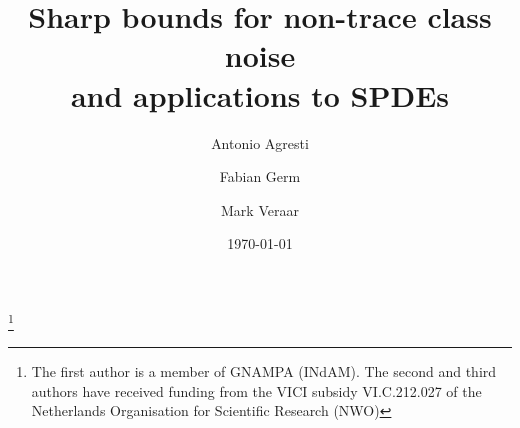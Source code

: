 \documentclass[reqno]{amsart}
\theoremstyle{plain}
\theoremstyle{remark}
\theoremstyle{plain}
\numberwithin{equation}{section}
\newcommand{\1}{\one}
\begin{document}
\author{Antonio Agresti}
\address{Department of Mathematics Guido Castelnuovo, Sapienza University of Rome,
P.le Aldo Moro 5, 00185 Rome, Italy}


\author{Fabian Germ}
\address{Delft Institute of Applied Mathematics\\
Delft University of Technology \\ P.O. Box 5031\\ 2600 GA Delft\\The
Netherlands.} 


\author{Mark Veraar}
\address{Delft Institute of Applied Mathematics\\
Delft University of Technology \\ P.O. Box 5031\\ 2600 GA Delft\\The
Netherlands.} 



\thanks{The first author is a member of GNAMPA (INdAM). The second and third authors have received funding from the VICI subsidy VI.C.212.027 of the Netherlands Organisation for Scientific Research (NWO)}


\date\today

\title[Sharp bounds for non-trace class noise]{Sharp bounds for non-trace class noise \\ and applications to SPDE\lowercase{s}}







\end{document}
